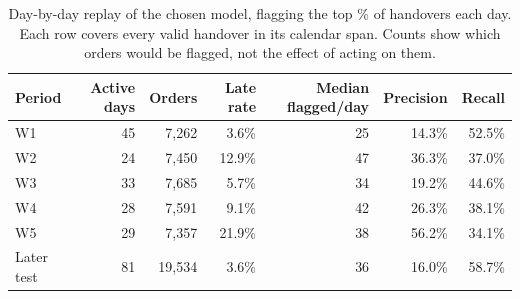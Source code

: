 \begin{table}[H]
\centering\small
\caption{Day-by-day replay of the chosen model, flagging the top \ActShare{}\% of handovers each day. Each row covers every valid handover in its calendar span. Counts show which orders would be flagged, not the effect of acting on them.}
\label{tab:daily-replay}
\begin{tabular}{@{}lrrrrrr@{}}
\toprule
Period & Active days & Orders & Late rate & Median flagged/day & Precision & Recall \\
\midrule
W1 & 45 & 7,262 & 3.6\% & 25 & 14.3\% & 52.5\% \\
W2 & 24 & 7,450 & 12.9\% & 47 & 36.3\% & 37.0\% \\
W3 & 33 & 7,685 & 5.7\% & 34 & 19.2\% & 44.6\% \\
W4 & 28 & 7,591 & 9.1\% & 42 & 26.3\% & 38.1\% \\
W5 & 29 & 7,357 & 21.9\% & 38 & 56.2\% & 34.1\% \\
Later test & 81 & 19,534 & 3.6\% & 36 & 16.0\% & 58.7\% \\
\bottomrule
\end{tabular}
\end{table}
